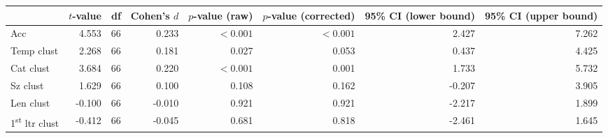 \begin{tabular}{lrrrrrrr}
\toprule
{} & $t$-value & df & Cohen's $d$ & $p$-value (raw) & $p$-value (corrected) & 95\% CI (lower bound) & 95\% CI (upper bound) \\
\midrule
Acc                             &     4.553 & 66 &       0.233 &       $< 0.001$ &             $< 0.001$ &                 2.427 &                 7.262 \\
Temp clust                      &     2.268 & 66 &       0.181 &           0.027 &                 0.053 &                 0.437 &                 4.425 \\
Cat clust                       &     3.684 & 66 &       0.220 &       $< 0.001$ &                 0.001 &                 1.733 &                 5.732 \\
Sz clust                        &     1.629 & 66 &       0.100 &           0.108 &                 0.162 &                -0.207 &                 3.905 \\
Len clust                       &    -0.100 & 66 &      -0.010 &           0.921 &                 0.921 &                -2.217 &                 1.899 \\
1\textsuperscript{st} ltr clust &    -0.412 & 66 &      -0.045 &           0.681 &                 0.818 &                -2.461 &                 1.645 \\
\bottomrule
\end{tabular}
